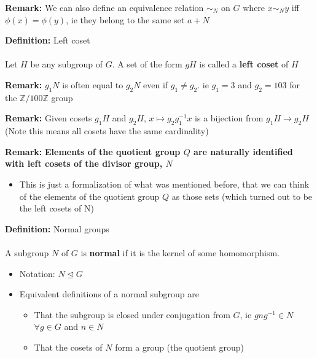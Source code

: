 \documentclass{article}
\newcommand{\Z}{\mathbb{Z}}
\begin{document}
\begin{remark} 
	\textbf{Remark:} We can also define an equivalence relation $\sim _N$ on $G$ where $x \sim _N y$ iff $\phi(x) = \phi(y)$, ie they belong to the same set $a + N$ 
\end{remark}
\begin{definition} 
\textbf{Definition:} Left coset \\
~\\
Let $H$ be any subgroup of $G$. A set of the form $gH$ is called a {\color{blue} \textbf{left coset}} of $H$
\end{definition}
\begin{remark} 
	\textbf{Remark:} $g_1N$ is often equal to $g_2N$ even if $g_1\neq g_2$. ie $g_1=3$ and $g_2=103$ for the $\Z /100\Z$ group 
\end{remark}
\begin{remark} 
	\textbf{Remark:} Given cosets $g_1H$ and $g_2H$, $x \mapsto g_2g_1^{-1}x$ is a bijection from $g_1H \to g_2H$ (Note this means all cosets have the same cardinality) 
\end{remark}
\begin{remark} 
	\textbf{Remark:} \textbf{Elements of the quotient group $Q$ are naturally identified with left cosets of the divisor group, $N$ } 
	\begin{itemize}
		\item This is just a formalization of what was mentioned before, that we can think of the elements of the quotient group $Q$ as those sets (which turned out to be the left cosets of N)
	\end{itemize}
\end{remark}
\begin{definition} 
\textbf{Definition:} Normal groups \\
~\\
A subgroup $N$ of $G$ is {\color{blue} \textbf{normal}} if it is the kernel of some homomorphism.
\begin{itemize}
	\item Notation: $N\trianglelefteq G$
	\item Equivalent definitions of a normal subgroup are
	\begin{itemize}
		\item That the subgroup is closed under conjugation from $G$, ie $gng^{-1}\in N$ $\forall g\in G$ and $n\in N$
		\item That the cosets of $N$ form a group (the quotient group)
	\end{itemize}
\end{itemize}
\end{definition}
\end{document}
